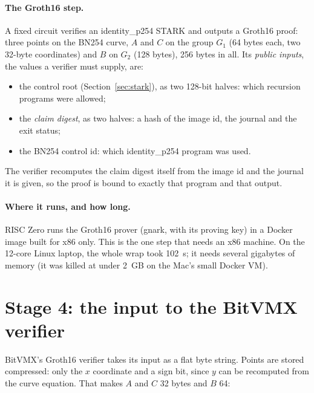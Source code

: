 \documentclass[11pt]{article}
\begin{document}
\paragraph{The Groth16 step.} A fixed circuit verifies an identity\_p254
STARK and outputs a Groth16 proof: three points on the BN254 curve, $A$
and $C$ on the group $G_1$ (64 bytes each, two 32-byte coordinates) and
$B$ on $G_2$ (128 bytes), 256 bytes in all. Its \emph{public inputs},
the values a verifier must supply, are:
\begin{itemize}[leftmargin=1.5em]
\item the control root (Section~\ref{sec:stark}), as two 128-bit halves:
  which recursion programs were allowed;
\item the \emph{claim digest}, as two halves: a hash of the image id,
  the journal and the exit status;
\item the BN254 control id: which identity\_p254 program was used.
\end{itemize}
The verifier recomputes the claim digest itself from the image id and
the journal it is given, so the proof is bound to exactly that program
and that output.

\paragraph{Where it runs, and how long.} RISC Zero runs the Groth16
prover (gnark, with its proving key) in a Docker image built for x86
only. This is the one step that needs an x86 machine. On the 12-core
Linux laptop, the whole wrap took 102~s; it needs several gigabytes of
memory (it was killed at under 2~GB on the Mac's small Docker VM).

\section{Stage 4: the input to the BitVMX verifier}
\label{sec:input}

BitVMX's Groth16 verifier takes its input as a flat byte string.
Points are stored compressed: only the $x$ coordinate and a sign bit,
since $y$ can be recomputed from the curve equation. That makes $A$ and
$C$ 32 bytes and $B$ 64:
\end{document}
